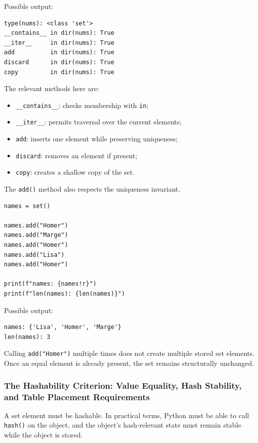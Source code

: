 Possible output:

\begin{verbatim}
type(nums): <class 'set'>
__contains__ in dir(nums): True
__iter__     in dir(nums): True
add          in dir(nums): True
discard      in dir(nums): True
copy         in dir(nums): True
\end{verbatim}

The relevant methods here are:

\begin{itemize}
    \item \texttt{\_\_contains\_\_}: checks membership with \texttt{in};
    \item \texttt{\_\_iter\_\_}: permits traversal over the current elements;
    \item \texttt{add}: inserts one element while preserving uniqueness;
    \item \texttt{discard}: removes an element if present;
    \item \texttt{copy}: creates a shallow copy of the set.
\end{itemize}

The \texttt{add()} method also respects the uniqueness invariant.

\begin{verbatim}
names = set()

names.add("Homer")
names.add("Marge")
names.add("Homer")
names.add("Lisa")
names.add("Homer")

print(f"names: {names!r}")
print(f"len(names): {len(names)}")
\end{verbatim}

Possible output:

\begin{verbatim}
names: {'Lisa', 'Homer', 'Marge'}
len(names): 3
\end{verbatim}

Calling \texttt{add("Homer")} multiple times does not create multiple stored set elements. Once an equal element is already present, the set remains structurally unchanged.

\subsubsection{The Hashability Criterion: Value Equality, Hash Stability, and Table Placement Requirements}

A set element must be hashable. In practical terms, Python must be able to call \texttt{hash()} on the object, and the object's hash-relevant state must remain stable while the object is stored.

